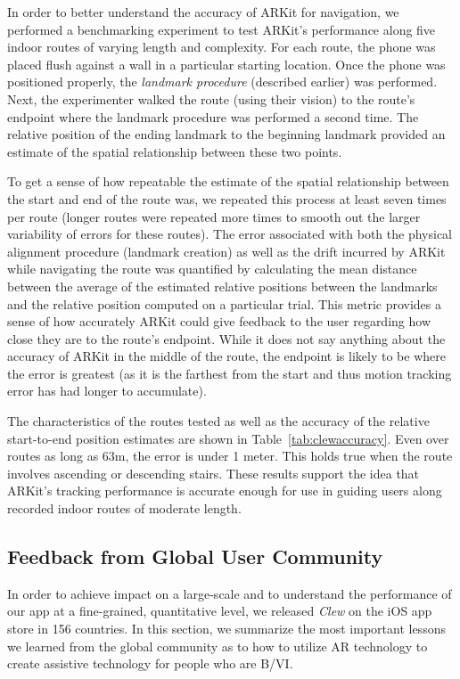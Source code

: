 \documentclass[chi]{sigchi}
\newcommand{\BVI}{B/VI\xspace}
\begin{document}
In order to better understand the accuracy of ARKit for navigation, we performed a benchmarking experiment to test ARKit's performance along five indoor routes of varying length and complexity.  For each route, the phone was placed flush against a wall in a particular starting location.  Once the phone was positioned properly, the \emph{landmark procedure} (described earlier) was performed.  Next, the experimenter walked the route (using their vision) to the route's endpoint where the landmark procedure was  performed a second time.  The relative position of the ending landmark to the beginning landmark provided an estimate of the spatial relationship between these two points.

To get a sense of how repeatable the estimate of the spatial relationship between the start and end of the route was, we repeated this process at least seven times per route (longer routes were repeated more times to smooth out the larger variability of errors for these routes).  The error associated with both the physical alignment procedure (landmark creation) as well as the drift incurred by ARKit while navigating the route was quantified by calculating the mean distance between the average of the estimated relative positions between the landmarks and the relative position computed on a particular trial.  This metric provides a sense of how accurately ARKit could give feedback to the user regarding how close they are to the route's endpoint.  While it does not say anything about the accuracy of ARKit in the middle of the route, the endpoint is likely to be where the error is greatest (as it is the farthest from the start and thus motion tracking error has had longer to accumulate).

The characteristics of the routes tested as well as the accuracy of the relative start-to-end position estimates are shown in Table~\ref{tab:clewaccuracy}.  Even over routes as long as 63m, the error is under 1 meter.  This holds true  when the route involves ascending or descending stairs.  These results support the idea that ARKit's tracking performance is accurate enough for use in guiding users along recorded indoor routes of moderate length.

\subsection{Feedback from Global User Community}
In order to achieve impact on a large-scale and to understand the performance of our app at a fine-grained, quantitative level, we released \emph{Clew} on the iOS app store in 156 countries.  In this section, we summarize the most important lessons we learned from the global community as to how to utilize AR technology to create assistive technology for people who are \BVI.
\end{document}

